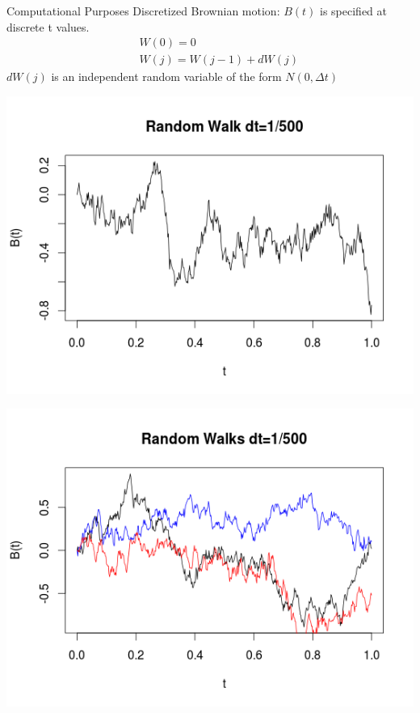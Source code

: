 \begin{frame}{Computational Purposes}
Discretized Brownian motion: $B(t)$ is specified at discrete t values.
\begin{eqnarray*}
&& W(0)=0\\
&& W(j)=W(j-1)+dW(j)
\end{eqnarray*}
$dW(j)$ is an independent random variable of the form $N(0,\Delta t)$
\end{frame}

\begin{frame}
\begin{center}
\includegraphics[scale=0.5]{r_w_3.png}
\end{center}
\end{frame}

\begin{frame}
\begin{center}
\includegraphics[scale=0.5]{r_w_4.png}
\end{center}
\end{frame}

